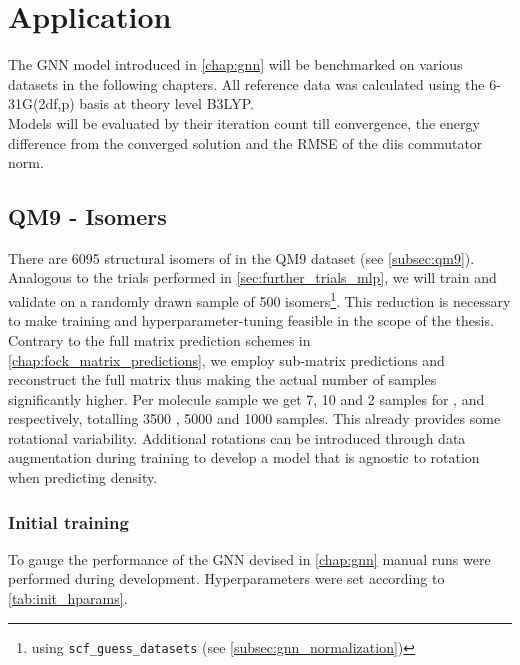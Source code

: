 \chapter{Application}
\label{chap:application}
The GNN model introduced in \autoref{chap:gnn} will be benchmarked on various datasets in the following chapters. All reference data was calculated using the 6-31G(2df,p) basis at theory level B3LYP. \\

Models will be evaluated by their iteration count till convergence, the energy difference from the converged solution and the RMSE of the diis commutator norm. 

\section{QM9 -  Isomers}
\label{sec:qm9_isomers_benchmark}
There are 6095 structural isomers of  in the QM9 dataset (see \autoref{subsec:qm9}). Analogous to the trials performed in \autoref{sec:further_trials_mlp}, we will train and validate on a randomly drawn sample of 500 isomers\footnote{using \texttt{scf\_guess\_datasets} (see \autoref{subsec:gnn_normalization})}. This reduction is necessary to make training and hyperparameter-tuning feasible in the scope of the thesis. Contrary to the full matrix prediction schemes in \autoref{chap:fock_matrix_predictions}, we employ sub-matrix predictions and reconstruct the full matrix thus making the actual number of samples significantly higher. Per molecule sample we get 7, 10 and 2 samples for ,  and  respectively, totalling 3500 , 5000  and 1000  samples. This already provides some rotational variability. Additional rotations can be introduced through data augmentation during training to develop a model that is agnostic to rotation when predicting density.\\

\subsection{Initial training}
\label{subsec:qm9_isomers_initial}
To gauge the performance of the GNN devised in \autoref{chap:gnn} manual runs were performed during development. Hyperparameters were set according to \autoref{tab:init_hparams}. 

